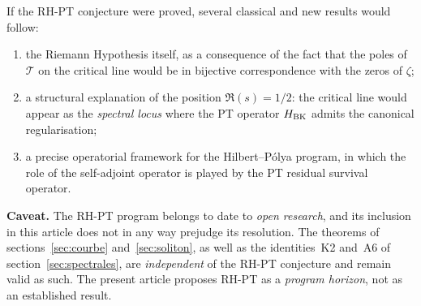 If the RH-PT conjecture were proved, several classical and new results would follow:
\begin{enumerate}[nosep,leftmargin=*]
\item the Riemann Hypothesis itself, as a consequence of the fact that the poles of $\mathcal T$ on the critical line would be in bijective correspondence with the zeros of $\zeta$;
\item a structural explanation of the position $\Re(s) = 1/2$: the critical line would appear as the \emph{spectral locus} where the PT operator $H_{\rm BK}$ admits the canonical regularisation;
\item a precise operatorial framework for the Hilbert--Pólya program, in which the role of the self-adjoint operator is played by the PT residual survival operator.
\end{enumerate}

\textbf{Caveat.} The RH-PT program belongs to date to \emph{open research}, and its inclusion in this article does not in any way prejudge its resolution. The theorems of sections~\ref{sec:courbe} and~\ref{sec:soliton}, as well as the identities~K2 and~A6 of section~\ref{sec:spectrales}, are \emph{independent} of the RH-PT conjecture and remain valid as such. The present article proposes RH-PT as a \emph{program horizon}, not as an established result.
